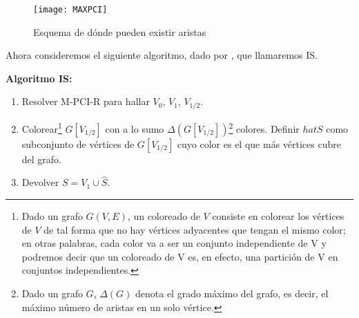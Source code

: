 \documentclass[a4paper,12pt,titlepage]{article}
\begin{document}
\begin{figure}[h]
\centering
\texttt{[image: MAXPCI]}
\caption{Esquema de d\'onde pueden existir aristas}
\label{pci:fig:1}
\end{figure}

Ahora consideremos el siguiente algoritmo, dado por \cite{max-pci3}, que llamaremos IS.

\vspace{0.3cm}

\textbf{Algoritmo IS:}

\begin{enumerate}
\item Resolver M-PCI-R para hallar $V_0$, $V_1$, $V_{1/2}$.
\item Colorear\footnote{Dado un grafo $G(V,E)$, un coloreado de $V$ consiste en colorear los v\'ertices de $V$ de tal forma que no hay v\'ertices adyacentes que tengan el mismo color; en otras palabras, cada color va a ser un conjunto independiente de V y podremos decir que un coloreado de V es, en efecto, una partici\'on de V en conjuntos independientes.} $G[V_{1/2}]$ con a lo sumo $\Delta(G[V_{1/2}])$\footnote{Dado un grafo $G$, $\Delta(G)$ denota el grado m\'aximo del grafo, es decir, el m\'aximo n\'umero de aristas en un solo v\'ertice.} colores. Definir $hat{S}$ como subconjunto de v\'ertices de $G[V_{1/2}]$ cuyo color es el que m\'as v\'ertices cubre del grafo.
\item Devolver $S = V_1\cup \hat{S}$.
\end{enumerate}
\end{document}
